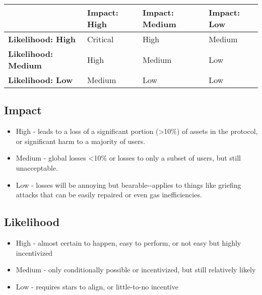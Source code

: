 \begin{table}[ht]
    \centering
    \begin{tabular}{|l|l|l|l|}
    \hline
                  & \textbf{Impact: High} & \textbf{Impact: Medium} & \textbf{Impact: Low} \\
    \hline
    \textbf{Likelihood: High}    & Critical       & High            & Medium         \\
    \hline
    \textbf{Likelihood: Medium}  & High           & Medium          & Low            \\
    \hline
    \textbf{Likelihood: Low}     & Medium         & Low             & Low            \\
    \hline
    \end{tabular}
\end{table}

\hypertarget{impact}{%
\subsection{Impact}\label{impact}}

\begin{itemize}
\tightlist
\item
  High - leads to a loss of a significant portion (\textgreater10\%) of
  assets in the protocol, or significant harm to a majority of users.
\item
  Medium - global losses \textless10\% or losses to only a subset of
  users, but still unacceptable.
\item
  Low - losses will be annoying but bearable-\/-applies to things like
  griefing attacks that can be easily repaired or even gas
  inefficiencies.
\end{itemize}

\hypertarget{likelihood}{%
\subsection{Likelihood}\label{likelihood}}

\begin{itemize}
\tightlist
\item
  High - almost certain to happen, easy to perform, or not easy but
  highly incentivized
\item
  Medium - only conditionally possible or incentivized, but still
  relatively likely
\item
  Low - requires stars to align, or little-to-no incentive
\end{itemize}


